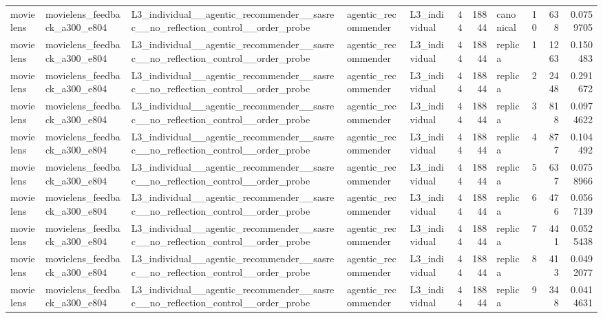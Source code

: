 \begin{table}[htbp!]
\begin{tabular}{lllllrrlrrr}
movielens & movielens\_feedback\_a300\_e804 & L3\_individual\_\_agentic\_recommender\_\_sasrec\_\_no\_reflection\_control\_\_order\_probe & agentic\_recommender & L3\_individual & 44 & 18844 & canonical & 10 & 638 & 0.0759705 \\
movielens & movielens\_feedback\_a300\_e804 & L3\_individual\_\_agentic\_recommender\_\_sasrec\_\_no\_reflection\_control\_\_order\_probe & agentic\_recommender & L3\_individual & 44 & 18844 & replica & 1 & 1263 & 0.150483 \\
movielens & movielens\_feedback\_a300\_e804 & L3\_individual\_\_agentic\_recommender\_\_sasrec\_\_no\_reflection\_control\_\_order\_probe & agentic\_recommender & L3\_individual & 44 & 18844 & replica & 2 & 2448 & 0.291672 \\
movielens & movielens\_feedback\_a300\_e804 & L3\_individual\_\_agentic\_recommender\_\_sasrec\_\_no\_reflection\_control\_\_order\_probe & agentic\_recommender & L3\_individual & 44 & 18844 & replica & 3 & 818 & 0.0974622 \\
movielens & movielens\_feedback\_a300\_e804 & L3\_individual\_\_agentic\_recommender\_\_sasrec\_\_no\_reflection\_control\_\_order\_probe & agentic\_recommender & L3\_individual & 44 & 18844 & replica & 4 & 877 & 0.104492 \\
movielens & movielens\_feedback\_a300\_e804 & L3\_individual\_\_agentic\_recommender\_\_sasrec\_\_no\_reflection\_control\_\_order\_probe & agentic\_recommender & L3\_individual & 44 & 18844 & replica & 5 & 637 & 0.0758966 \\
movielens & movielens\_feedback\_a300\_e804 & L3\_individual\_\_agentic\_recommender\_\_sasrec\_\_no\_reflection\_control\_\_order\_probe & agentic\_recommender & L3\_individual & 44 & 18844 & replica & 6 & 476 & 0.0567139 \\
movielens & movielens\_feedback\_a300\_e804 & L3\_individual\_\_agentic\_recommender\_\_sasrec\_\_no\_reflection\_control\_\_order\_probe & agentic\_recommender & L3\_individual & 44 & 18844 & replica & 7 & 441 & 0.0525438 \\
movielens & movielens\_feedback\_a300\_e804 & L3\_individual\_\_agentic\_recommender\_\_sasrec\_\_no\_reflection\_control\_\_order\_probe & agentic\_recommender & L3\_individual & 44 & 18844 & replica & 8 & 413 & 0.0492077 \\
movielens & movielens\_feedback\_a300\_e804 & L3\_individual\_\_agentic\_recommender\_\_sasrec\_\_no\_reflection\_control\_\_order\_probe & agentic\_recommender & L3\_individual & 44 & 18844 & replica & 9 & 348 & 0.0414631 \\

\end{tabular}
\end{table}

